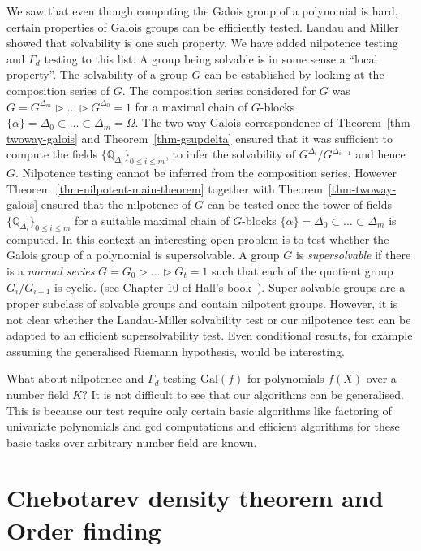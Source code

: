 \documentclass[11pt]{madras}%
\theoremstyle{remark}
\newcommand{\Gal}[1]{{\ensuremath{\mathrm{Gal}\left(#1\right)}}}
\begin{document}
We saw that even though computing the Galois group of a polynomial is
hard, certain properties of Galois groups can be efficiently tested.
Landau and Miller showed that solvability is one such property.  We
have added nilpotence testing and $\Gamma_d$ testing to this list.  A
group being solvable is in some sense a ``local property''. The
solvability of a group $G$ can be established by looking at the
composition series of $G$. The composition series considered for $G$
was $G = G^{\Delta_m} \rhd \ldots \rhd G^{\Delta_0} = 1$ for a maximal
chain of $G$-blocks $\{ \alpha \} = \Delta_0 \subset \ldots \subset
\Delta_m = \Omega$. The two-way Galois correspondence of
Theorem~\ref{thm-twoway-galois} and Theorem~\ref{thm-gsupdelta}
ensured that it was sufficient to compute the fields $\{
\mathbb{Q}_{\Delta_i}\}_{0 \leq i \leq m}$, to infer the solvability
of $G^{\Delta_i}/G^{\Delta_{i-1}}$ and hence $G$.  Nilpotence testing
cannot be inferred from the composition series. However
Theorem~\ref{thm-nilpotent-main-theorem} together with
Theorem~\ref{thm-twoway-galois} ensured that the nilpotence of $G$ can
be tested once the tower of fields $\{\mathbb{Q}_{\Delta_i} \}_{0 \leq
  i \leq m}$ for a suitable maximal chain of $G$-blocks $\{ \alpha \}
= \Delta_0 \subset \ldots \subset \Delta_m$ is computed. In this
context an interesting open problem is to test whether the Galois
group of a polynomial is supersolvable.  A group $G$ is
\emph{supersolvable} if there is a
\emph{normal series} $G = G_0 \rhd \ldots\rhd G_t = 1$ such that each
of the quotient group $G_i/G_{i+1}$ is cyclic. (see Chapter 10 of
Hall's book~\cite{hall}).  Super solvable groups are a proper subclass
of solvable groups and contain nilpotent groups.  However, it is not
clear whether the Landau-Miller solvability test or our nilpotence
test can be adapted to an efficient supersolvability test.  Even
conditional results, for example assuming the generalised Riemann
hypothesis, would be interesting.

What about nilpotence and $\Gamma_d$ testing $\Gal{f}$ for polynomials
$f(X)$ over a number field $K$? It is not difficult to see that our
algorithms can be generalised. This is because our test require only
certain basic algorithms like factoring of univariate polynomials and
gcd computations and efficient algorithms for these basic tasks over
arbitrary number field are known.


\chapter{Chebotarev density theorem and Order
  finding}\label{chap-order-finding}
\end{document}
